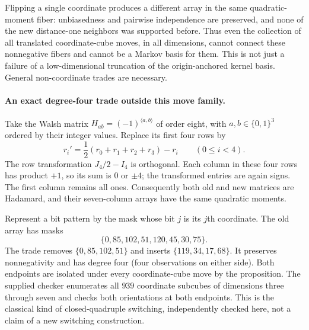 Flipping a single coordinate produces a different array in the same
quadratic-moment fiber: unbiasedness and pairwise independence are
preserved, and none of the new distance-one neighbors was supported
before. Thus even the collection of all translated coordinate-cube moves,
in all dimensions, cannot connect these nonnegative fibers and cannot
be a Markov basis for them. This is not just a failure of a low-dimensional truncation of the
origin-anchored kernel basis. General non-coordinate trades are necessary.

\paragraph{An exact degree-four trade outside this move family.}
Take the Walsh matrix $H_{ab}=(-1)^{\langle a,b\rangle}$ of order eight,
with $a,b\in\{0,1\}^3$ ordered by their integer values. Replace its
first four rows by
\[
 r_i'=\frac12(r_0+r_1+r_2+r_3)-r_i\qquad(0\le i<4).
\]
The row transformation $J_4/2-I_4$ is orthogonal. Each column in these
four rows has product $+1$, so its sum is $0$ or $\pm4$; the transformed
entries are again signs. The first column remains all ones. Consequently
both old and new matrices are Hadamard, and their seven-column arrays
have the same quadratic moments.

Represent a bit pattern by the mask whose bit $j$ is its $j$th coordinate.
The old array has masks
\[
 \{0,85,102,51,120,45,30,75\}.
\]
The trade removes $\{0,85,102,51\}$ and inserts
$\{119,34,17,68\}$. It preserves nonnegativity and has degree four
(four observations on either side). Both endpoints are isolated under
every coordinate-cube move by the proposition. The supplied checker
enumerates all $939$ coordinate subcubes of dimensions three through
seven and checks both orientations at both endpoints. This is the
classical kind of closed-quadruple switching, independently checked here,
not a claim of a new switching construction.

